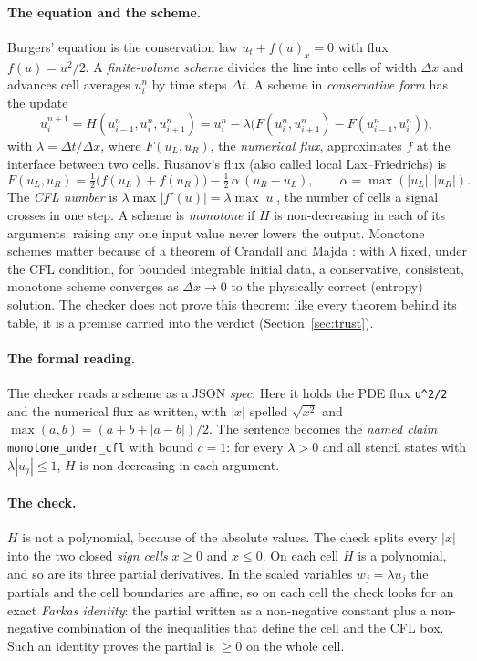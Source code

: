 \documentclass[11pt,a4paper]{article}
\newcommand{\code}[1]{\texttt{#1}}
\begin{document}
\paragraph{The equation and the scheme.} Burgers' equation is the conservation law
$u_t + f(u)_x = 0$ with flux $f(u) = u^2/2$. A \emph{finite-volume scheme} divides the line into
cells of width $\Delta x$ and advances cell averages $u_i^n$ by time steps $\Delta t$. A scheme in
\emph{conservative form} has the update
\begin{equation}\label{eq:update}
u_i^{n+1} = H(u_{i-1}^n, u_i^n, u_{i+1}^n) = u_i^n - \lambda\bigl(F(u_i^n, u_{i+1}^n) - F(u_{i-1}^n, u_i^n)\bigr),
\end{equation}
with $\lambda = \Delta t/\Delta x$, where $F(u_L, u_R)$, the \emph{numerical flux}, approximates $f$ at the interface between two cells.
Rusanov's flux \cite{rusanov1961} (also called local Lax--Friedrichs) is
\[
F(u_L, u_R) = \tfrac12\bigl(f(u_L) + f(u_R)\bigr) - \tfrac12\,\alpha\,(u_R - u_L),\qquad
\alpha = \max(|u_L|, |u_R|).
\]
The \emph{CFL number} is $\lambda \max|f'(u)| = \lambda\max|u|$, the number of cells a signal crosses
in one step. A scheme is \emph{monotone} if $H$ is non-decreasing in each of its arguments: raising
any one input value never lowers the output. Monotone schemes matter because of a theorem of
Crandall and Majda \cite{crandallmajda1980}: with $\lambda$ fixed, under the CFL condition, for bounded
integrable initial data, a conservative, consistent, monotone scheme converges as $\Delta x \to 0$ to the
physically correct (entropy) solution. The checker does not prove this theorem: like every theorem behind
its table, it is a premise carried into the verdict (Section~\ref{sec:trust}).

\paragraph{The formal reading.} The checker reads a scheme as a JSON \emph{spec}. Here it holds the
PDE flux \code{u\^{}2/2} and the numerical flux as written, with $|x|$ spelled
$\sqrt{x^2}$ and $\max(a,b) = (a + b + |a - b|)/2$. The sentence becomes the \emph{named claim}
\code{monotone\_under\_cfl} with bound $c = 1$: for every $\lambda > 0$ and all stencil states with
$\lambda|u_j| \le 1$, $H$ is non-decreasing in each argument.

\paragraph{The check.} $H$ is not a polynomial, because of the absolute values. The check splits
every $|x|$ into the two closed \emph{sign cells} $x \ge 0$ and $x \le 0$. On each cell $H$ is a
polynomial, and so are its three partial derivatives. In the scaled variables $w_j = \lambda u_j$ the
partials and the cell boundaries are affine, so on each cell the check looks for an exact
\emph{Farkas identity}: the partial written as a non-negative constant plus a non-negative
combination of the inequalities that define the cell and the CFL box. Such an identity proves the
partial is $\ge 0$ on the whole cell.
\end{document}
